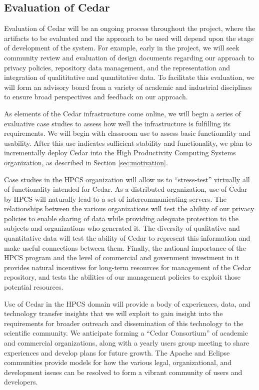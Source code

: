 \subsection{Evaluation of Cedar}

Evaluation of Cedar will be an ongoing process throughout the project,
where the artifacts to be evaluated and the approach to be used will depend
upon the stage of development of the system.  For example, early in the
project, we will seek community review and evaluation of design documents
regarding our approach to privacy policies, repository data management, and
the representation and integration of qualititative and quantitative data.
To facilitate this evaluation, we will form an advisory board from a
variety of academic and industrial disciplines to ensure broad perspectives
and feedback on our approach. 

As elements of the Cedar infrastructure come online, we will begin a series
of evaluative case studies to assess how well the infrastructure is
fulfilling its requirements.  We will begin with classroom use to assess
basic functionality and usability.  After this use indicates sufficient
stability and functionality, we plan to incrementally deploy Cedar into the
High Productivity Computing Systems organization, as described in Section
\ref{sec:motivation}.

Case studies in the HPCS organization will allow us to ``stress-test''
virtually all of functionality intended for Cedar.  As a distributed
organization, use of Cedar by HPCS will naturally lead to a set of
intercommunicating servers.  The relationships between the various
organizations will test the ability of our privacy policies to enable
sharing of data while providing adequate protection to the subjects and
organizations who generated it.  The diversity of qualitative and
quantitative data will test the ability of Cedar to represent this
information and make useful connections between them.  Finally, the
national importance of the HPCS program and the level of commercial and
government investment in it provides natural incentives for long-term
resources for management of the Cedar repository, and tests the abilities
of our management policies to exploit those potential resources.

Use of Cedar in the HPCS domain will provide a body of experiences, data,
and technology transfer insights that we will exploit to gain insight into
the requirements for broader outreach and dissemination of this technology
to the scientific community.  We anticipate forming a ``Cedar Consortium''
of academic and commercial organizations, along with a yearly users group
meeting to share experiences and develop plans for future growth.  The
Apache and Eclipse communities provide models for how the various legal,
organizational, and development issues can be resolved to form a vibrant
community of users and developers.

